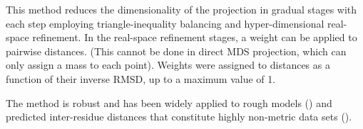 \documentclass{bmcart}
\begin{document}
This method reduces the dimensionality of the projection in gradual stages
with each step employing triangle-inequality balancing and hyper-dimensional real-space refinement.
In the real-space refinement stages, a weight can be applied to pairwise distances. (This cannot be
done in direct MDS projection, which can only assign a mass to each point).
Weights were assigned to distances as a function of their inverse RMSD, up to a maximum value of 1.

The method is robust and
has been widely applied to rough models (\cite{TaylorWRet09a}) and predicted inter-residue distances that
constitute highly non-metric data sets (\cite{AszodiAet94a}).

\ \\ \\ \\ \\ \\ \\ \\ \\ \\ \\ \\ \\ \\
\ \\ \\ \\ \\ \\ \\ \\ \\ \\ \\ \\ \\ \\


\end{document}
